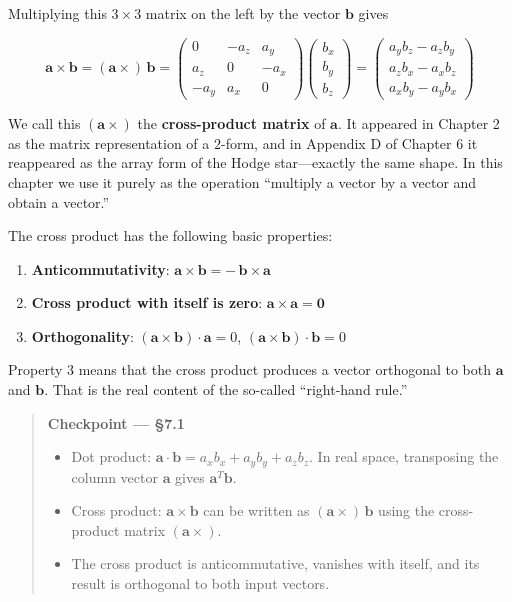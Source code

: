 Multiplying this \(3\times 3\) matrix on the left by the vector
\(\mathbf{b}\) gives

\[\mathbf{a} \times \mathbf{b} = (\mathbf{a} \times)\,\mathbf{b} = \begin{pmatrix}
0 & -a_z & a_y \\
a_z & 0 & -a_x \\
-a_y & a_x & 0
\end{pmatrix}\begin{pmatrix}
b_x \\ b_y \\ b_z
\end{pmatrix} = \begin{pmatrix}
a_y b_z - a_z b_y \\
a_z b_x - a_x b_z \\
a_x b_y - a_y b_x
\end{pmatrix}\]

We call this \((\mathbf{a} \times)\) the \textbf{cross-product matrix}
of \(\mathbf{a}\). It appeared in Chapter 2 as the matrix representation
of a \(2\)-form, and in Appendix D of Chapter 6 it reappeared as the
array form of the Hodge star---exactly the same shape. In this chapter
we use it purely as the operation ``multiply a vector by a vector and
obtain a vector.''

The cross product has the following basic properties:

\begin{enumerate}
\def\labelenumi{\arabic{enumi}.}
\tightlist
\item
  \textbf{Anticommutativity}:
  \(\mathbf{a} \times \mathbf{b} = -\,\mathbf{b} \times \mathbf{a}\)
\item
  \textbf{Cross product with itself is zero}:
  \(\mathbf{a} \times \mathbf{a} = \mathbf{0}\)
\item
  \textbf{Orthogonality}:
  \((\mathbf{a} \times \mathbf{b}) \cdot \mathbf{a} = 0\),
  \((\mathbf{a} \times \mathbf{b}) \cdot \mathbf{b} = 0\)
\end{enumerate}

Property 3 means that the cross product produces a vector orthogonal to
both \(\mathbf{a}\) and \(\mathbf{b}\). That is the real content of the
so-called ``right-hand rule.''

\begin{quote}
\textbf{Checkpoint — §7.1}

\begin{itemize}
\item
  Dot product:
  \(\mathbf{a}\cdot\mathbf{b} = a_x b_x + a_y b_y + a_z b_z\). In real
  space, transposing the column vector \(\mathbf{a}\) gives
  \(\mathbf{a}^T \mathbf{b}\).
\item
  Cross product: \(\mathbf{a}\times\mathbf{b}\) can be written as
  \((\mathbf{a}\times)\,\mathbf{b}\) using the cross-product matrix
  \((\mathbf{a}\times)\).
\item
  The cross product is anticommutative, vanishes with itself, and its
  result is orthogonal to both input vectors.
\end{itemize}
\end{quote}

